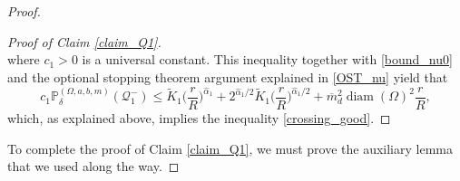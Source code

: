 \documentclass{article}
\newcommand{\PP}{{\mathbb{P}}}
\theoremstyle{definition}
\theoremstyle{remark}
\theoremstyle{remark}
\begin{document}
\begin{proof}
\begin{proof}[Proof of Claim \ref{claim_Q1}]
\begin{equation*}
\end{equation*}
where $c_1>0$ is a universal constant. This inequality together with \eqref{bound_nu0} and the optional stopping theorem argument explained in \eqref{OST_nu} yield that
\begin{equation*}
    c_1 \PP_{\delta}^{(\Omega,a,b,m)}(\mathcal{Q}_{1}^{-}) \leq \tilde K_{1} \bigg(\frac{r}{R}\bigg)^{\hat \alpha_1} + 2^{\hat \alpha_1 /2} \tilde K_1 \bigg(\frac{r}{R}\bigg)^{\hat \alpha_1 /2} + \overline{m}_d^2\operatorname{diam}(\Omega)^2 \frac{r}{R},
\end{equation*}
which, as explained above, implies the inequality \eqref{crossing_good}.
\end{proof}

To complete the proof of Claim \ref{claim_Q1}, we must prove the auxiliary lemma that we used along the way.


\end{proof}
\end{document}
